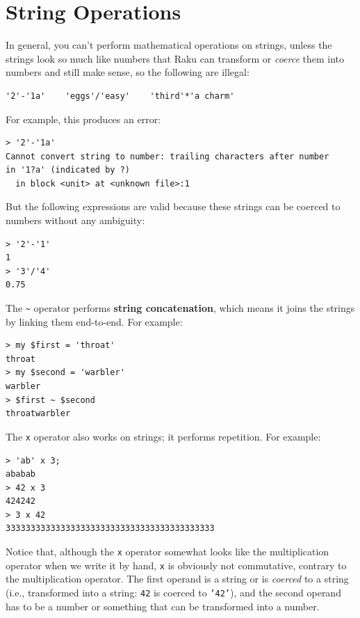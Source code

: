 \section{String Operations}
\label{string_operations}

In general, you can't perform mathematical operations on strings, unless
the strings look so much like numbers that Raku can transform or \emph{coerce} them into numbers and still make sense, so the 
following are illegal:

\begin{verbatim}
'2'-'1a'    'eggs'/'easy'    'third'*'a charm'
\end{verbatim}
%

For example, this produces an error:

\begin{verbatim}
> '2'-'1a'
Cannot convert string to number: trailing characters after number 
in '1?a' (indicated by ?)
  in block <unit> at <unknown file>:1
\end{verbatim}
%
  
But the following expressions are valid because these strings 
can be coerced to numbers without any ambiguity:
\begin{verbatim}
> '2'-'1'
1
> '3'/'4'
0.75
\end{verbatim}
%

The \verb'~' operator performs {\bf string concatenation}, which means
it joins the strings by linking them end-to-end.  For example:

\begin{verbatim}
> my $first = 'throat'
throat
> my $second = 'warbler'
warbler
> $first ~ $second
throatwarbler
\end{verbatim}
%
The {\tt x} operator also works on strings; it performs repetition.
For example:

\begin{verbatim}
> 'ab' x 3;
ababab
> 42 x 3
424242
> 3 x 42
333333333333333333333333333333333333333333
\end{verbatim}

Notice that, although the {\tt x} operator somewhat looks like 
the multiplication operator when we write it by hand, {\tt x} 
is obviously not commutative, contrary to the {\tt *} 
multiplication operator. The first operand is a string or is 
\emph{coerced} to a string (i.e., transformed into a string: 
{\tt 42} is coerced to {\tt '42'}), and the second operand 
has to be a number or something that can be transformed 
into a number.



